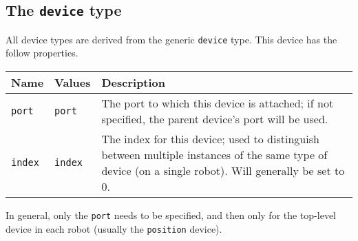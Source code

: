 \documentclass[11pt]{report}
\begin{document}
\subsection{The {\tt device} type}

All device types are derived from the generic \verb'device' type.
This device has the follow properties.
\begin{table}[h]
\begin{tabularx}{\columnwidth}{llX}
\hline
Name & Values & Description \\
\hline

\verb'port' & \verb'port' & The port to which this device is attached;
if not specified, the parent device's port will be used.\\

\verb'index' & \verb'index' & The index for this device; used to
distinguish between multiple instances of the same type of device (on
a single robot).  Will generally be set to 0.\\

\hline
\end{tabularx}
\end{table}
\noindent In general, only the \verb'port' needs to be specified, and
then only for the top-level device in each robot (usually the
\verb'position' device).
\end{document}
